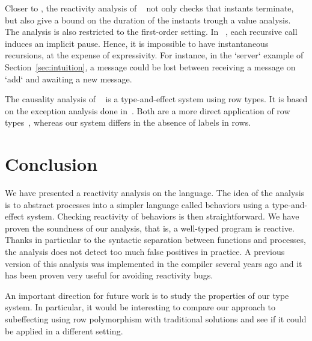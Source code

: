 \documentclass[9pt,preprint]{sigplanconf}
\begin{document}
Closer to \rml, the reactivity analysis of \funloft~\cite{Amadio:2007b} not only checks that instants terminate, but also give a bound on the duration of the instants trough a value analysis. The analysis is also restricted to the first-order setting. In \ulm~\cite{Boudol:2004}, each recursive call induces an implicit pause. Hence, it is impossible to have instantaneous recursions, at the expense of expressivity. For instance, in the `server` example of Section~\ref{sec:intuition}, a message could be lost between receiving a message on `add` and awaiting a new message.

The causality analysis of \lucy~\cite{Cuoq:2001} is a type-and-effect system using row types. It is based on the exception analysis done in~\cite{Leroy:2000}. Both are a more direct application of row types~\cite{Remy:1993}, whereas our system differs in the absence of labels in rows.

\section{Conclusion}

We have presented a reactivity analysis on the \rml language. The idea of the analysis is to abstract processes into a simpler language called behaviors using a type-and-effect system. Checking reactivity of behaviors is then straightforward. We have proven the soundness of our analysis, that is, a well-typed program is reactive. Thanks in particular to the syntactic separation between functions and processes, the analysis does not detect too much false positives in practice. A previous version of this analysis was implemented in the \rml compiler several years ago and it has been proven very useful for avoiding reactivity bugs. 

An important direction for future work is to study the properties of our type system. In particular, it would be interesting to compare our approach to subeffecting using row polymorphism with traditional solutions and see if it could be applied in a different setting.
%
%



\begin{small}

\end{small}

\end{document}

